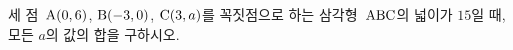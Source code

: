 세 점~$\mathrm{A}(0{,}\mkern3mu\mathopen{}6)$, $\mathrm{B}(-3{,}\mkern3mu\mathopen{}0)$, $\mathrm{C}(3{,}\mkern3mu\mathopen{}a)$를 꼭짓점으로 하는 삼각형~$\mathrm{ABC}$의 넓이가 $15$일 때, 모든 $a$의 값의 합을 구하시오.
